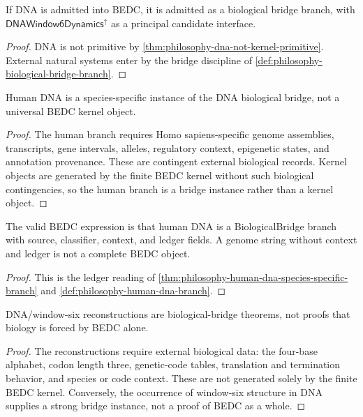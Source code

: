 \begin{corollary}
\label{cor:philosophy-dna-as-biological-bridge-branch}
If DNA is admitted into BEDC, it is admitted as a biological bridge
branch, with $\mathsf{DNAWindow6Dynamics}^{\uparrow}$ as a principal
candidate interface.
\end{corollary}
\begin{proof}
DNA is not primitive by \autoref{thm:philosophy-dna-not-kernel-primitive}.
External natural systems enter by the bridge discipline of
\autoref{def:philosophy-biological-bridge-branch}.
\end{proof}

\begin{theorem}
\label{thm:philosophy-human-dna-species-specific-branch}
Human DNA is a species-specific instance of the DNA biological bridge,
not a universal BEDC kernel object.
\end{theorem}
\begin{proof}
The human branch requires Homo sapiens-specific genome assemblies,
transcripts, gene intervals, alleles, regulatory context, epigenetic
states, and annotation provenance. These are contingent external
biological records. Kernel objects are generated by the finite BEDC
kernel without such biological contingencies, so the human branch is a
bridge instance rather than a kernel object.
\end{proof}

\begin{corollary}
\label{cor:philosophy-human-dna-requires-ledger}
The valid BEDC expression is that human DNA is a BiologicalBridge branch
with source, classifier, context, and ledger fields. A genome string
without context and ledger is not a complete BEDC object.
\end{corollary}
\begin{proof}
This is the ledger reading of
\autoref{thm:philosophy-human-dna-species-specific-branch} and
\autoref{def:philosophy-human-dna-branch}.
\end{proof}

\begin{theorem}
\label{thm:philosophy-dna-window-six-results-bridge-theorems}
DNA/window-six reconstructions are biological-bridge theorems, not
proofs that biology is forced by BEDC alone.
\end{theorem}
\begin{proof}
The reconstructions require external biological data: the four-base
alphabet, codon length three, genetic-code tables, translation and
termination behavior, and species or code context. These are not
generated solely by the finite BEDC kernel. Conversely, the occurrence
of window-six structure in DNA supplies a strong bridge instance, not a
proof of BEDC as a whole.
\end{proof}

